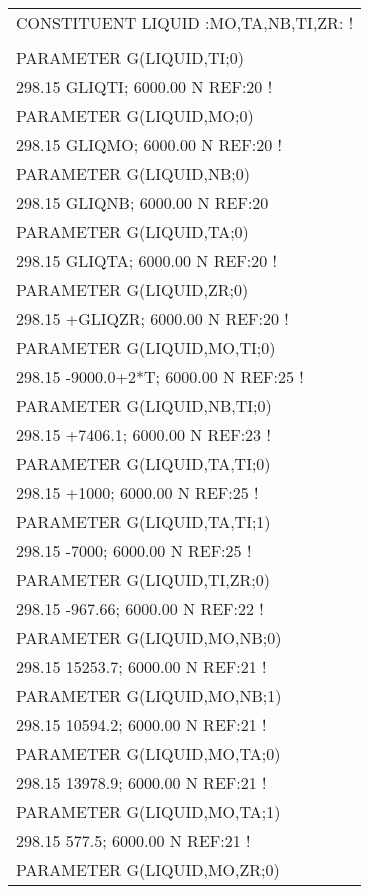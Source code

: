 \begin{longtable}[H]{ l l l }
	\multicolumn{3}{l}{CONSTITUENT LIQUID :MO,TA,NB,TI,ZR: !}\\
	& & \\
	PARAMETER G(LIQUID,TI;0) & &\\
	\multicolumn{3}{l}{298.15 GLIQTI; 6000.00 N REF:20 !}\\
	PARAMETER G(LIQUID,MO;0)& &\\
	\multicolumn{3}{l}{298.15 GLIQMO; 6000.00 N REF:20 !}\\
	PARAMETER G(LIQUID,NB;0) & & \\
	\multicolumn{3}{l}{298.15 GLIQNB; 6000.00 N REF:20 }\\
	PARAMETER G(LIQUID,TA;0) & &\\
	\multicolumn{3}{l}{298.15 GLIQTA; 6000.00 N REF:20 !}\\
	PARAMETER G(LIQUID,ZR;0) & &\\
	\multicolumn{3}{l}{298.15 +GLIQZR; 6000.00 N REF:20 !}\\
	PARAMETER G(LIQUID,MO,TI;0) & & \\
	\multicolumn{3}{l}{298.15 -9000.0+2*T; 6000.00 N REF:25 !}\\
	PARAMETER G(LIQUID,NB,TI;0) & & \\
	\multicolumn{3}{l}{298.15 +7406.1; 6000.00 N REF:23 !}\\	 
	PARAMETER G(LIQUID,TA,TI;0) & & \\
	\multicolumn{3}{l}{298.15 +1000; 6000.00 N REF:25 !}\\
	PARAMETER G(LIQUID,TA,TI;1) & & \\
	\multicolumn{3}{l}{298.15 -7000; 6000.00 N REF:25 !}\\	 
	PARAMETER G(LIQUID,TI,ZR;0) & & \\
	\multicolumn{3}{l}{298.15 -967.66; 6000.00 N REF:22 !}\\ 
	PARAMETER G(LIQUID,MO,NB;0) & & \\
	\multicolumn{3}{l}{298.15 15253.7; 6000.00 N REF:21 !}\\
	PARAMETER G(LIQUID,MO,NB;1) & & \\
	\multicolumn{3}{l}{298.15 10594.2; 6000.00 N REF:21 !}\\	 	 
	PARAMETER G(LIQUID,MO,TA;0) & & \\
	\multicolumn{3}{l}{298.15 13978.9; 6000.00 N REF:21 !}\\
	PARAMETER G(LIQUID,MO,TA;1) & & \\
	\multicolumn{3}{l}{298.15 577.5; 6000.00 N REF:21 !}\\
	PARAMETER G(LIQUID,MO,ZR;0) & & \\

\end{longtable}
